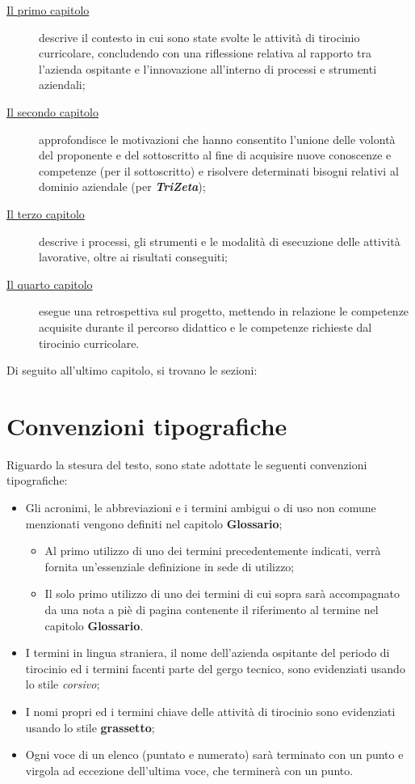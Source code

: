 \begin{description}
    \item[{\hyperref[cap:contesto-svolgimento]{Il primo capitolo}}] descrive il contesto in cui sono state svolte le attività di tirocinio curricolare, concludendo con una riflessione relativa al rapporto tra l'azienda ospitante e l'innovazione all'interno di processi e strumenti aziendali; 
    
    \item[{\hyperref[cap:motivazioni-tirocinio]{Il secondo capitolo}}] approfondisce le motivazioni che hanno consentito l'unione delle volontà del proponente e del sottoscritto al fine di acquisire nuove conoscenze e competenze (per il sottoscritto) e risolvere determinati bisogni relativi al dominio aziendale (per \textbf{\textit{TriZeta}});
    
    \item[{\hyperref[cap:elementi-progetto]{Il terzo capitolo}}] descrive i processi, gli strumenti e le modalità di esecuzione delle attività lavorative, oltre ai risultati conseguiti;
    
    \item[{\hyperref[cap:resoconto]{Il quarto capitolo}}] esegue una retrospettiva sul progetto, mettendo in relazione le competenze acquisite durante il percorso didattico e le competenze richieste dal tirocinio curricolare.
\end{description}

Di seguito all'ultimo capitolo, si trovano le sezioni:


\section*{Convenzioni tipografiche}

Riguardo la stesura del testo, sono state adottate le seguenti convenzioni tipografiche:
\begin{itemize}
	\item Gli acronimi, le abbreviazioni e i termini ambigui o di uso non comune menzionati vengono definiti nel capitolo \textbf{Glossario}; 
        \begin{itemize}
            \item Al primo utilizzo di uno dei termini precedentemente indicati, verrà fornita un'essenziale definizione in sede di utilizzo;
            \item Il solo primo utilizzo di uno dei termini di cui sopra sarà accompagnato da una nota a piè di pagina contenente il riferimento al termine nel capitolo \textbf{Glossario}.
        \end{itemize} 
	\item I termini in lingua straniera, il nome dell'azienda ospitante del periodo di tirocinio ed i termini facenti parte del gergo tecnico, sono evidenziati usando lo stile \textit{corsivo};
	\item I nomi propri ed i termini chiave delle attività di tirocinio sono evidenziati usando lo stile \textbf{grassetto};
	\item Ogni voce di un elenco (puntato e numerato) sarà terminato con un punto e virgola ad eccezione dell'ultima voce, che terminerà con un punto.
\end{itemize}

